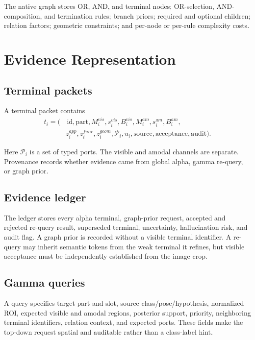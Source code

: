 \documentclass[11pt]{article}
\begin{document}
The native graph stores OR, AND, and terminal nodes; OR-selection, AND-composition,
and termination rules; branch priors; required and optional children; relation
factors; geometric constraints; and per-node or per-rule complexity costs.

\section{Evidence Representation}

\subsection{Terminal packets}

A terminal packet contains
\begin{align*}
t_i = (&\,\text{id},\text{part},M_i^{vis},s_i^{vis},B_i^{vis},
M_i^{am},s_i^{am},B_i^{am},\\
&z_i^{app},z_i^{func},z_i^{geom},\mathcal{P}_i,u_i,
\text{source},\text{acceptance},\text{audit}).
\end{align*}

Here $\mathcal{P}_i$ is a set of typed ports. The visible and amodal channels are
separate. Provenance records whether evidence came from global alpha, gamma
re-query, or graph prior.

\subsection{Evidence ledger}

The ledger stores every alpha terminal, graph-prior request, accepted and rejected
re-query result, superseded terminal, uncertainty, hallucination risk, and audit
flag. A graph prior is recorded without a visible terminal identifier. A re-query
may inherit semantic tokens from the weak terminal it refines, but visible
acceptance must be independently established from the image crop.

\subsection{Gamma queries}

A query specifies target part and slot, source class/pose/hypothesis, normalized
ROI, expected visible and amodal regions, posterior support, priority, neighboring
terminal identifiers, relation context, and expected ports. These fields make the
top-down request spatial and auditable rather than a class-label hint.
\end{document}
